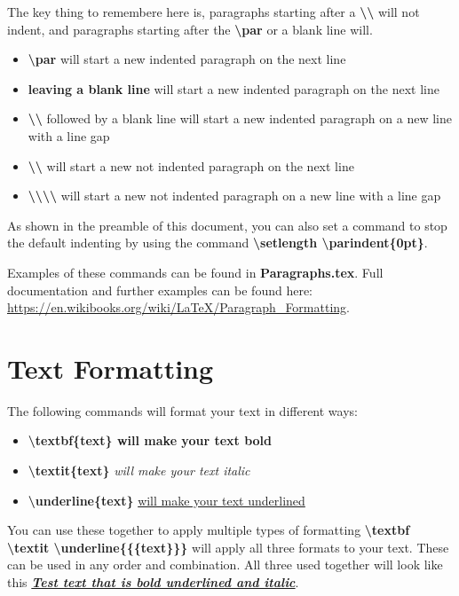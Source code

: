 \documentclass[10pt, titlepage]{article}
\begin{document}
The key thing to remembere here is, paragraphs starting after a \textbf{\textbackslash \textbackslash} will not indent, and paragraphs starting after the \textbf{\textbackslash par} or a blank line will. 

\begin{itemize}
	\item{\textbf{\textbackslash par} will start a new indented paragraph on the next line}
	\item{\textbf{leaving a blank line} will start a new indented paragraph on the next line}
	\item{\textbf{\textbackslash \textbackslash} followed by a blank line will start a new indented paragraph on a new line with a line gap}
	\item{\textbf{\textbackslash \textbackslash} will start a new not indented paragraph on the next line}
	\item{\textbf{\textbackslash \textbackslash\textbackslash \textbackslash} will start a new not indented paragraph on a new line with a line gap}

\end{itemize}

As shown in the preamble of this document, you can also set a command to stop the default indenting by using the command \textbf{\textbackslash setlength \textbackslash parindent\{0pt\}}. 

Examples of these commands can be found in \textbf{Paragraphs.tex}. Full documentation and further examples can be found here: \url{https://en.wikibooks.org/wiki/LaTeX/Paragraph_Formatting}.

\section{Text Formatting}
The following commands will format your text in different ways:

\begin{itemize}
	\item{\textbf{\textbackslash textbf\{text\} will make your text bold}}
	\item{\textbf{\textbackslash textit\{text\}} \textit{will make your text italic}}
	\item{\textbf{\textbackslash underline\{text\}} \underline{will make your text underlined}}
\end{itemize}

You can use these together to apply multiple types of formatting \textbf{\textbackslash textbf \textbackslash textit \textbackslash underline\{\{\{text\}\}\}} will apply all three formats to your text. These can be used in any order and combination. All three used together will look like this \textbf{\underline{\textit{Test text that is bold underlined and italic}}}.
\end{document}
